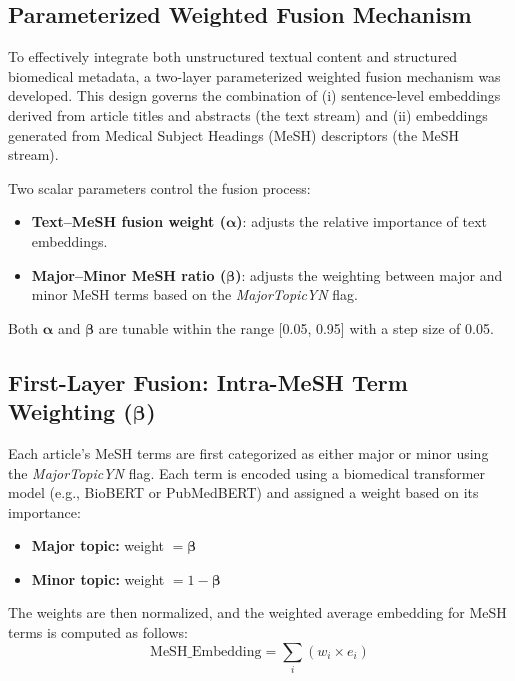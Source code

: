 \documentclass[authorproof,JACIII,researchpaper]{fujipressarticle}
\begin{document}
\subsection{Parameterized Weighted Fusion Mechanism}
To effectively integrate both unstructured textual content and structured biomedical metadata,
a two-layer parameterized weighted fusion mechanism was developed.
This design governs the combination of
(i) sentence-level embeddings derived from article titles and abstracts (the text stream) and
(ii) embeddings generated from Medical Subject Headings (MeSH) descriptors (the MeSH stream).

Two scalar parameters control the fusion process:
\begin{itemize}
    \item \textbf{Text--MeSH fusion weight ($\boldsymbol{\alpha}$)}: adjusts the relative importance of text embeddings.
    \item \textbf{Major--Minor MeSH ratio ($\boldsymbol{\beta}$)}: adjusts the weighting between major and minor MeSH terms based on the \textit{MajorTopicYN} flag.
\end{itemize}

Both $\boldsymbol{\alpha}$ and $\boldsymbol{\beta}$ are tunable within the range [0.05, 0.95] with a step size of 0.05.

\subsection{First-Layer Fusion: Intra-MeSH Term Weighting ($\boldsymbol{\beta}$)}

Each article's MeSH terms are first categorized as either major or minor using the \textit{MajorTopicYN} flag.
Each term is encoded using a biomedical transformer model (e.g., BioBERT or PubMedBERT) and assigned a weight based on its importance:

\begin{itemize}
    \item \textbf{Major topic:} weight $= \boldsymbol{\beta}$
    \item \textbf{Minor topic:} weight $= 1 - \boldsymbol{\beta}$
\end{itemize}

The weights are then normalized, and the weighted average embedding for MeSH terms is computed as follows:
\begin{equation}
\text{MeSH\_Embedding} = \sum_i (w_i \times e_i)
\label{eq:mesh_embedding}
\end{equation}
\end{document}
